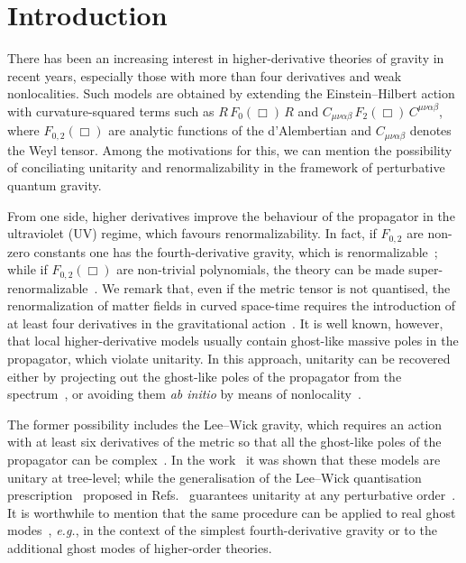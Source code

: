 \documentclass[aps,prd,a4paper,twocolumn,showpacs,showkeys,preprintnumbers,amsmath,amssymb,nofootinbib]{revtex4-2}
\renewcommand{\thesection}{\arabic{section}}
\numberwithin{equation}{section}
\let\oldsection\section%
\renewcommand{\section}{%
  \renewcommand{\theequation}{\thesection.\arabic{equation}}%
  \oldsection}%
\def\al{\alpha}
\def\be{\beta}
\begin{document}
\section{Introduction}
\label{Sec1}

There has been an increasing interest in higher-derivative theories of gravity in recent years, especially those with more than four derivatives and weak nonlocalities. Such models are obtained by extending the Einstein--Hilbert action with curvature-squared terms such as $R \, F_0 (\Box)  \, R$ and $C_{\mu\nu\al\be} \, {F}_2(\Box) \, C^{\mu\nu\al\be}$, where $F_{0,2}(\Box)$ are analytic functions of the d'Alembertian and $C_{\mu\nu\al\be}$ denotes the Weyl tensor.
Among the motivations for this, we can mention the possibility of conciliating unitarity and renormalizability in the framework of perturbative quantum gravity. 

From one side, higher derivatives improve the behaviour of the propagator in the ultraviolet (UV) regime, which favours renormalizability. In fact, if $F_{0,2}$ are non-zero constants one has the fourth-derivative gravity, which is renormalizable~\cite{Stelle77}; while if $F_{0,2}(\Box)$ are non-trivial polynomials, the theory can be made super-renormalizable~\cite{AsoreyLopezShapiro}. We remark that, even if the metric tensor is not quantised, the renormalization of matter fields in curved space-time requires the introduction of at least four derivatives in the gravitational action~\cite{UtDW}.
It is well known, however, that local higher-derivative models usually contain ghost-like massive poles in the propagator, which violate unitarity.
%
In this approach, unitarity can be recovered either by projecting out the ghost-like poles of the propagator from the spectrum~\cite{ModestoShapiro16,Modesto16,AnselmiPiva1,AnselmiPiva2,AnselmiPiva3,Anselmi:2017ygm}, or avoiding them \textit{ab initio} by means of nonlocality~\cite{Krasnikov,Kuzmin,Tomboulis,Modesto12}. 

The former possibility includes the Lee--Wick gravity, which requires an action with at least six derivatives of the metric so that all the ghost-like poles of the propagator can be complex~\cite{ModestoShapiro16,Modesto16}. In the work~\cite{ModestoShapiro16} it was shown that these models are unitary at tree-level; while the generalisation of the Lee--Wick quantisation prescription~\cite{LW1,LW2,CLOP} proposed in Refs.~\cite{AnselmiPiva1,AnselmiPiva2} guarantees unitarity at any perturbative order~\cite{AnselmiPiva3}. It is worthwhile to mention that the same procedure can be applied to real ghost modes~\cite{Anselmi:2017ygm}, \textit{e.g.}, in the context of the simplest fourth-derivative gravity or to the additional ghost modes of higher-order theories.
\end{document}
